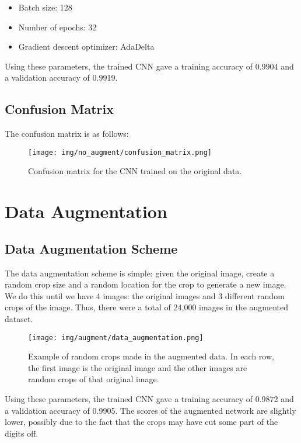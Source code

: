 \documentclass{article}
\begin{document}
\begin{itemize}
    \item Batch size: 128
    \item Number of epochs: 32
    \item Gradient descent optimizer: AdaDelta
\end{itemize}


Using these parameters, the trained CNN gave a training accuracy of 0.9904 and a validation accuracy of 0.9919.

\subsection{Confusion Matrix}
The confusion matrix is as follows:

\begin{figure}[ht]
\centering
\texttt{[image: img/no\_augment/confusion\_matrix.png]}
\caption{Confusion matrix for the CNN trained on the original data.}
\end{figure}





\section{Data Augmentation}

\subsection{Data Augmentation Scheme}
The data augmentation scheme is simple: given the original image, create a random crop size and a random location for the crop to generate a new image. We do this until we have 4 images: the original images and 3 different random crops of the image. Thus, there were a total of 24,000 images in the augmented dataset.

\begin{figure}[ht]
\centering
\texttt{[image: img/augment/data\_augmentation.png]}
\caption{Example of random crops made in the augmented data. In each row, the first image is the original image and the other images are random crops of that original image.}
\end{figure}

Using these parameters, the trained CNN gave a training accuracy of 0.9872 and a validation accuracy of 0.9905. The scores of the augmented network are slightly lower, possibly due to the fact that the crops may have cut some part of the digits off.
\end{document}
